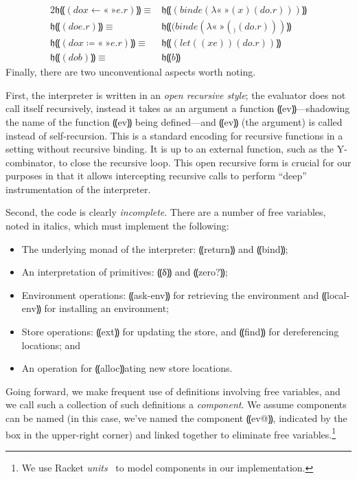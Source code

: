 \begin{alignat*}{2}
   𝔥⸨(do x ←«\ »e . r)⸩ ≡ &\mathrel{} 𝔥⸨(bind e (λ«\ »(x) (do . r)))⸩
\\        𝔥⸨(do e . r)⸩ ≡ &\mathrel{} 𝔥⸨(bind e (λ«\ »(_) (do . r)))⸩
\\ 𝔥⸨(do x ≔«\ »e . r)⸩ ≡ &\mathrel{} 𝔥⸨(let ((x e)) (do . r))⸩
\\            𝔥⸨(do b)⸩ ≡ &\mathrel{} 𝔥⸨b⸩
\end{alignat*}
Finally, there are two unconventional aspects worth noting.

First, the interpreter is written in an \emph{open recursive style}; the
evaluator does not call itself recursively, instead it takes as an argument a
function ⸨ev⸩—shadowing the name of the function ⸨ev⸩ being defined—and ⸨ev⸩
(the argument) is called instead of self-recursion.  This is a standard
encoding for recursive functions in a setting without recursive binding.  It is
up to an external function, such as the Y-combinator, to close the recursive
loop.  This open recursive form is crucial for our purposes in that it allows
intercepting recursive calls to perform “deep” instrumentation of the
interpreter.

Second, the code is clearly \emph{incomplete}.  There are a number of free
variables, noted in italics, which must implement the following:
\begin{itemize}
\item The underlying monad of the interpreter: ⸨return⸩ and ⸨bind⸩;
\item An interpretation of primitives: ⸨δ⸩ and ⸨zero?⸩;
\item Environment operations: ⸨ask-env⸩ for retrieving the
environment and ⸨local-env⸩ for installing an environment;
\item Store operations: ⸨ext⸩ for updating the store, and ⸨find⸩ for
dereferencing locations; and
\item An operation for ⸨alloc⸩ating new store locations.
\end{itemize}
Going forward, we make frequent use of definitions involving free variables,
and we call such a collection of such definitions a \emph{component}. We assume
components can be named (in this case, we've named the component ⸨ev@⸩,
indicated by the box in the upper-right corner) and linked together to
eliminate free variables.\footnote{We use Racket
\emph{units}~\cite{local:flatt-pldi98} to model components in our
implementation.}

